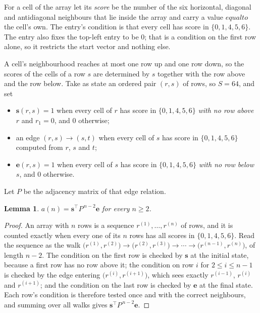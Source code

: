 \documentclass[11pt,a4paper]{article}
\theoremstyle{plain}
\newtheorem{lemma}[theorem]{Lemma}
\theoremstyle{definition}
\begin{document}
For a cell of the array let its \emph{score} be the number of the six horizontal, diagonal and antidiagonal neighbours that lie inside
the array and carry a value $equal to$ the cell's own. The entry's condition is that every cell
has score in $\{0,1,4,5,6\}$. The entry also fixes the top-left entry to be $0$; that is a condition on the first row alone, so it restricts the start vector and nothing else.

A cell's neighbourhood reaches at most one row up and one row down, so the scores of the
cells of a row $s$ are determined by $s$ together with the row above and the row below.
Take as state an ordered pair $(r,s)$ of rows, so $S=64$, and set
\begin{itemize}
\item $\mathbf{s}(r,s)=1$ when every cell of $r$ has score in $\{0,1,4,5,6\}$ \emph{with no row
above $r$} and $r_1=0$, and $0$ otherwise;
\item an edge $(r,s)\to(s,t)$ when every cell of $s$ has score in $\{0,1,4,5,6\}$ computed from
$r$, $s$ and $t$;
\item $\mathbf{e}(r,s)=1$ when every cell of $s$ has score in $\{0,1,4,5,6\}$ \emph{with no row
below $s$}, and $0$ otherwise.
\end{itemize}
Let $P$ be the adjacency matrix of that edge relation.

\begin{lemma}\label{lem:walk}
$a(n)=\mathbf{s}^{\!\top}P^{\,n-2}\mathbf{e}$ for every $n\ge2$.
\end{lemma}

\begin{proof}
An array with $n$ rows is a sequence $r^{(1)},\dots,r^{(n)}$ of rows, and it is counted
exactly when every one of its $n$ rows has all scores in $\{0,1,4,5,6\}$. Read the sequence as the
walk $\bigl(r^{(1)},r^{(2)}\bigr)\to\bigl(r^{(2)},r^{(3)}\bigr)\to\cdots\to
\bigl(r^{(n-1)},r^{(n)}\bigr)$, of length $n-2$. The condition on the first row is
checked by $\mathbf{s}$ at the initial state, because a first row has no row above it; the
condition on row $i$ for $2\le i\le n-1$ is checked by the edge entering
$\bigl(r^{(i)},r^{(i+1)}\bigr)$, which sees exactly $r^{(i-1)}$, $r^{(i)}$ and
$r^{(i+1)}$; and the condition on the last row is checked by $\mathbf{e}$ at the final
state. Each row's condition is therefore tested once and with the correct neighbours, and
summing over all walks gives $\mathbf{s}^{\!\top}P^{\,n-2}\mathbf{e}$.
\end{proof}
\end{document}
